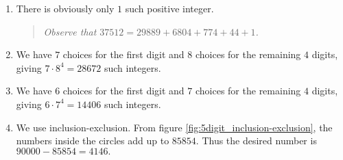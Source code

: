 \documentclass[11pt, openany]{book}
\theoremstyle{change} \theoremheaderfont{\blue\sffamily\bfseries}
\theoremstyle{nonumberplain} \theoremheaderfont{\sffamily\bfseries}
\newenvironment{rem}[0]{\begin{quote}{\huge\textcolor{red}{\Pisymbol{pzd}{43}}}\itshape }{\end{quote}}
\newcommand{\í}{\'{\i}}
\begin{document}
\begin{multicols}{2}
\begin{enumerate}
  \item There is obviously  only $1$ such positive integer.

\begin{rem}Observe that $37512 = 29889 + 6804 + 774 + 44 +
1$.\end{rem}

\item  We have $7$ choices for the first digit and $8$ choices for
the remaining $4$ digits, giving $7\cdot 8^4 = 28672$ such integers.


\item  We have $6$ choices for the first digit and $7$ choices for
the remaining $4$ digits, giving $6\cdot 7^4 = 14406$ such integers.


\item  We use inclusion-exclusion. From figure
\ref{fig:5digit_inclusion-exclusion}, the numbers inside the circles
add up to $85854$. Thus the desired number is $90000-85854=4146.$
\end{enumerate}
\end{multicols}
\end{document}
